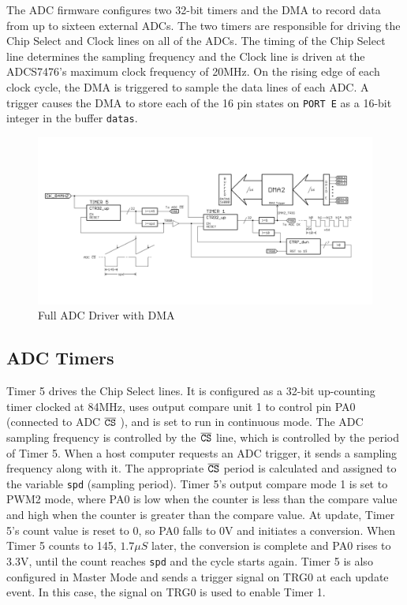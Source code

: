 \documentclass[11pt,twoside]{mitthesis}
\begin{document}
The ADC firmware configures two 32-bit timers and the DMA to record data from up to sixteen external ADCs.
The two timers are responsible for driving the Chip Select and Clock lines on all of the ADCs.
The timing of the Chip Select line determines the sampling frequency and the Clock line is driven at the ADCS7476's maximum clock frequency of 20MHz.
On the rising edge of each clock cycle, the DMA is triggered to sample the data lines of each ADC.
A trigger causes the DMA to store each of the 16 pin states on \texttt{PORT E} as a 16-bit integer in the buffer \texttt{datas}.

\begin{figure}[H]
  \begin{center}
      \includegraphics[width=1\textwidth]{../ADC.png}
      \caption{Full ADC Driver with DMA}
  \end{center}
\end{figure}


\subsection{ADC Timers}

Timer 5 drives the Chip Select lines.
It is configured as a 32-bit up-counting timer clocked at 84MHz, uses output compare unit 1 to control pin PA0 (connected to ADC $\overline{\mbox{\texttt{CS}}}$ ), and is set to run in continuous mode.
The ADC sampling frequency is controlled by the $\overline{\mbox{\texttt{CS}}}$ line, which is controlled by the period of Timer 5.
When a host computer requests an ADC trigger, it sends a sampling frequency along with it.
The appropriate $\overline{\mbox{\texttt{CS}}}$ period is calculated and assigned to the variable \texttt{spd} (sampling period).
Timer 5's output compare mode 1 is set to PWM2 mode, where PA0 is low when the counter is less than the compare value and high when the counter is greater than the compare value.
At update, Timer 5's count value is reset to 0, so PA0 falls to 0V and initiates a conversion.
When Timer 5 counts to 145, $1.7\mu S$ later, the conversion is complete and PA0 rises to 3.3V, until the count reaches \texttt{spd} and the cycle starts again.
Timer 5 is also configured in Master Mode and sends a trigger signal on TRG0 at each update event.
In this case, the signal on TRG0 is used to enable Timer 1.
\end{document}
